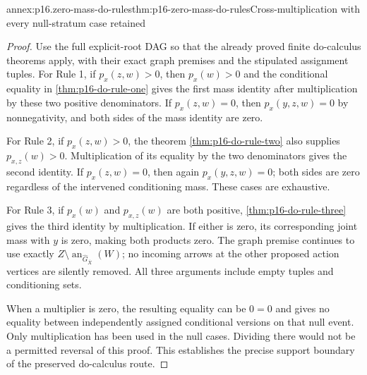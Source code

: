 \begin{annexitem}{annex:p16.zero-mass-do-rules}{thm:p16-zero-mass-do-rules}{Cross-multiplication with every null-stratum case retained}
\begin{proof}
Use the full explicit-root DAG so that the already proved finite
do-calculus theorems apply, with their exact graph premises and
the stipulated assignment tuples. For Rule 1, if \(p_x(z,w)>0\),
then \(p_x(w)>0\) and the conditional equality in
\cref{thm:p16-do-rule-one} gives the first mass identity after
multiplication by these two positive denominators. If
\(p_x(z,w)=0\), then \(p_x(y,z,w)=0\) by nonnegativity,
and both sides of the mass identity are zero.

For Rule 2, if \(p_x(z,w)>0\), the theorem
\cref{thm:p16-do-rule-two} also supplies \(p_{x,z}(w)>0\).
Multiplication of its equality by the two denominators gives
the second identity. If \(p_x(z,w)=0\), then again
\(p_x(y,z,w)=0\); both sides are zero regardless of the
intervened conditioning mass. These cases are exhaustive.

For Rule 3, if \(p_x(w)\) and \(p_{x,z}(w)\) are both
positive, \cref{thm:p16-do-rule-three} gives the third identity
by multiplication. If either is zero, its corresponding joint
mass with \(y\) is zero, making both products zero. The
graph premise continues to use exactly
\(Z\setminus\operatorname{an}_{\widehat G_{\overline X}}(W)\);
no incoming arrows at the other proposed action vertices are
silently removed. All three arguments include empty tuples and
conditioning sets.

When a multiplier is zero, the resulting equality can be
\(0=0\) and gives no equality between independently assigned
conditional versions on that null event. Only multiplication
has been used in the null cases. Dividing there would not
be a permitted reversal of this proof. This establishes the
precise support boundary of the preserved do-calculus route.
\end{proof}
\end{annexitem}

